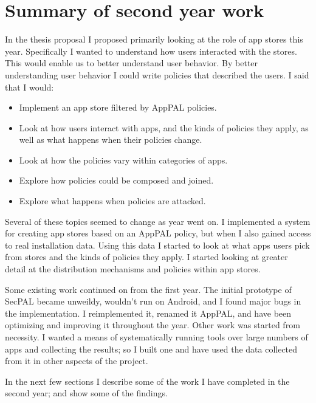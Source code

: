 \documentclass[a4paper]{scrartcl}
\begin{document}
\section{Summary of second year work}


In the thesis proposal I proposed primarily looking at the role of app stores this year.
Specifically I wanted to understand how users interacted with the stores.
This would enable us to better understand user behavior.
By better understanding user behavior I could write policies that described the users.
I said that I would:

\begin{itemize}
  \item Implement an app store filtered by AppPAL policies.
  \item Look at how users interact with apps, and the kinds of policies they apply, as well as what happens when their policies change.
  \item Look at how the policies vary within categories of apps.
  \item Explore how policies could be composed and joined.
  \item Explore what happens when policies are attacked.
\end{itemize}

Several of these topics seemed to change as year went on.
I implemented a system for creating app stores based on an AppPAL policy, but when I also gained access to real installation data.
Using this data I started to look at what apps users pick from stores and the kinds of policies they apply.
I started looking at greater detail at the distribution mechanisms and policies within app stores.

Some existing work continued on from the first year.
The initial prototype of SecPAL became unweildy, wouldn't run on Android, and I found major bugs in the implementation.
I reimplemented it, renamed it AppPAL, and have been optimizing and improving it throughout the year.
Other work was started from necessity.
I wanted a means of systematically running tools over large numbers of apps and collecting the results;
  so I built one and have used the data collected from it in other aspects of the project.

In the next few sections I describe some of the work I have completed in the second year; and show some of the findings.
\end{document}
